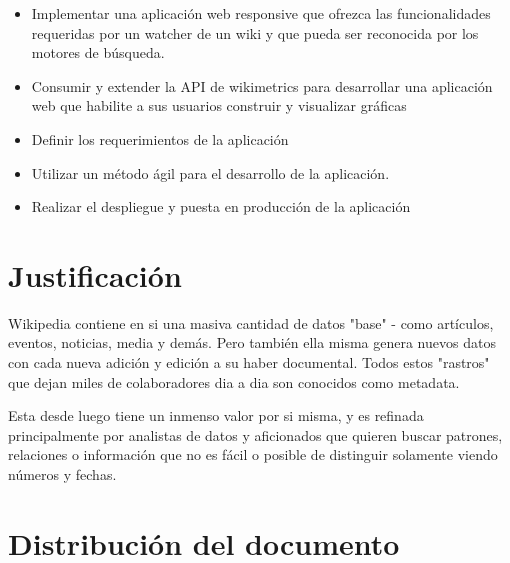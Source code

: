 \begin{itemize}{}{}

    \item Implementar una aplicación web responsive que ofrezca las funcionalidades requeridas por un watcher de un wiki y que pueda ser reconocida por los motores de búsqueda.
    \item Consumir y extender la API de wikimetrics para desarrollar una aplicación web que habilite a sus usuarios construir y visualizar gráficas
    \item Definir los requerimientos de la aplicación
    \item Utilizar un método ágil para el desarrollo de la aplicación.
    \item Realizar el despliegue y puesta en producción de la aplicación

\end{itemize}


\section{Justificación}

Wikipedia contiene en si una masiva cantidad de datos "base" - como artículos, eventos, noticias, media y demás. Pero también ella misma genera nuevos datos con cada nueva adición y edición a su haber documental. Todos estos "rastros" que dejan miles de colaboradores dia a dia son conocidos como metadata.

Esta desde luego tiene un inmenso valor por si misma, y es refinada principalmente por analistas de datos y aficionados que quieren buscar patrones, relaciones o información que no es fácil o posible de distinguir solamente viendo números y fechas.










\section{Distribución del documento}

